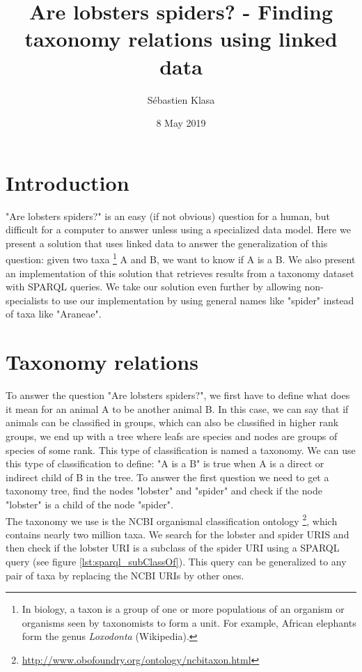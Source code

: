 \documentclass{article}
\title{Are lobsters spiders? - Finding taxonomy relations using linked data}
\author{Sébastien Klasa}
\date{8 May 2019}
\begin{document}
	\maketitle
	
	\section{Introduction}
	
	"Are lobsters spiders?" is an easy (if not obvious) question for a human, but difficult for a computer to answer unless using a specialized data model. Here we present a solution that uses linked data to answer the generalization of this question: given two taxa \footnote{In biology, a taxon is a group of one or more populations of an organism or organisms seen by taxonomists to form a unit. For example, African elephants form the genus \textit{Loxodonta} (Wikipedia).} A and B, we want to know if A is a B. We also present an implementation of this solution that retrieves results from a taxonomy dataset with SPARQL queries. We take our solution even further by allowing non-specialists to use our implementation by using general names like "spider" instead of taxa like "Araneae".
	
	\section{Taxonomy relations}
	\label{sec:taxonomy_relations}
	
	To answer the question "Are lobsters spiders?", we first have to define what does it mean for an animal A to be another animal B. In this case, we can say that if animals can be classified in groups, which can also be classified in higher rank groups, we end up with a tree where leafs are species and nodes are groups of species of some rank. This type of classification is named a taxonomy. We can use this type of classification to define: "A is a B" is true when A is a direct or indirect child of B in the tree. To answer the first question we need to get a taxonomy tree, find the nodes "lobster" and "spider" and check if the node "lobster" is a child of the node "spider".
	\\
	
	The taxonomy we use is the NCBI organismal classification ontology \footnote{\url{http://www.obofoundry.org/ontology/ncbitaxon.html}}, which contains nearly two million taxa. We search for the lobster and spider URIS and then check if the lobster URI is a subclass of the spider URI using a SPARQL query (see figure \ref{lst:sparql_subClassOf}). This query can be generalized to any pair of taxa by replacing the NCBI URIs by other ones.
	
\end{document}

